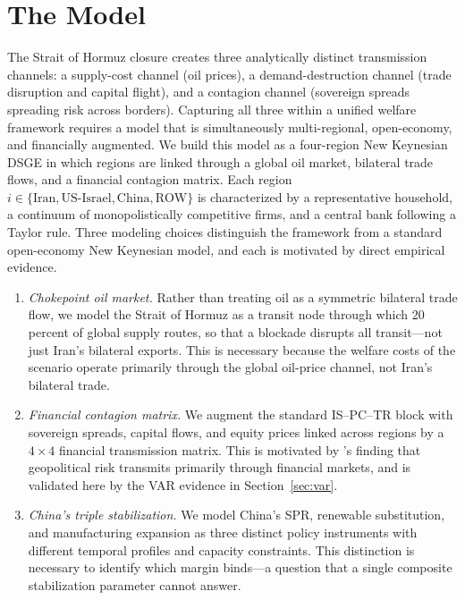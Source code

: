 \documentclass[12pt]{article}
\begin{document}

\section{The Model}
\label{sec:model}

The Strait of Hormuz closure creates three analytically distinct transmission channels: a supply-cost channel (oil prices), a demand-destruction channel (trade disruption and capital flight), and a contagion channel (sovereign spreads spreading risk across borders). Capturing all three within a unified welfare framework requires a model that is simultaneously multi-regional, open-economy, and financially augmented. We build this model as a four-region New Keynesian DSGE in which regions are linked through a global oil market, bilateral trade flows, and a financial contagion matrix. Each region $i \in \{\text{Iran}, \text{US-Israel}, \text{China}, \text{ROW}\}$ is characterized by a representative household, a continuum of monopolistically competitive firms, and a central bank following a Taylor rule. Three modeling choices distinguish the framework from a standard open-economy New Keynesian model, and each is motivated by direct empirical evidence.

\begin{enumerate}[leftmargin=2em, itemsep=2pt, topsep=4pt]
\item \textit{Chokepoint oil market.} Rather than treating oil as a symmetric bilateral trade flow, we model the Strait of Hormuz as a transit node through which 20 percent of global supply routes, so that a blockade disrupts all transit---not just Iran's bilateral exports. This is necessary because the welfare costs of the scenario operate primarily through the global oil-price channel, not Iran's bilateral trade.
\item \textit{Financial contagion matrix.} We augment the standard IS--PC--TR block with sovereign spreads, capital flows, and equity prices linked across regions by a $4 \times 4$ financial transmission matrix. This is motivated by \citet{caldara2022measuring}'s finding that geopolitical risk transmits primarily through financial markets, and is validated here by the VAR evidence in Section~\ref{sec:var}.
\item \textit{China's triple stabilization.} We model China's SPR, renewable substitution, and manufacturing expansion as three distinct policy instruments with different temporal profiles and capacity constraints. This distinction is necessary to identify which margin binds---a question that a single composite stabilization parameter cannot answer.
\end{enumerate}
\end{document}
